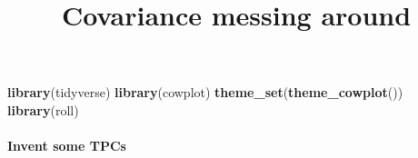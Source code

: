 \documentclass[]{article}
\title{Covariance messing around}
\author{}
\date{}
\newenvironment{Shaded}{\begin{snugshade}}{\end{snugshade}}
\newcommand{\KeywordTok}[1]{\textcolor[rgb]{0.13,0.29,0.53}{\textbf{{#1}}}}
\newcommand{\DataTypeTok}[1]{\textcolor[rgb]{0.13,0.29,0.53}{{#1}}}
\newcommand{\OtherTok}[1]{\textcolor[rgb]{0.56,0.35,0.01}{{#1}}}
\newcommand{\NormalTok}[1]{{#1}}
\let\oldparagraph\paragraph
\renewcommand{\paragraph}[1]{\oldparagraph{#1}\mbox{}}
\begin{document}
\maketitle

\begin{Shaded}
\end{Shaded}

\begin{Shaded}
\begin{Highlighting}[]
\KeywordTok{library}\NormalTok{(tidyverse)}
\KeywordTok{library}\NormalTok{(cowplot)}
\KeywordTok{theme_set}\NormalTok{(}\KeywordTok{theme_cowplot}\NormalTok{())}
\KeywordTok{library}\NormalTok{(roll)}
\end{Highlighting}
\end{Shaded}

\paragraph{Invent some TPCs}\label{invent-some-tpcs}
\end{document}
